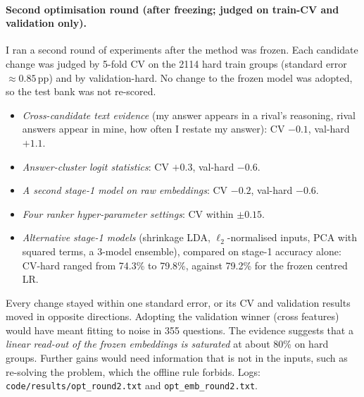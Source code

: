 \documentclass[10pt,a4paper]{article}
\begin{document}
\paragraph{Second optimisation round (after freezing; judged on train-CV and validation only).}
I ran a second round of experiments after the method was frozen. Each candidate change was judged by 5-fold CV on the 2114 hard train groups (standard error ${\approx}0.85$\,pp) and by validation-hard. No change to the frozen model was adopted, so the test bank was not re-scored.
\begin{itemize}
\item \emph{Cross-candidate text evidence} (my answer appears in a rival's reasoning, rival answers appear in mine, how often I restate my answer): CV $-0.1$, val-hard $+1.1$.
\item \emph{Answer-cluster logit statistics}: CV $+0.3$, val-hard $-0.6$.
\item \emph{A second stage-1 model on raw embeddings}: CV $-0.2$, val-hard $-0.6$.
\item \emph{Four ranker hyper-parameter settings}: CV within $\pm0.15$.
\item \emph{Alternative stage-1 models} (shrinkage LDA, $\ell_2$-normalised inputs, PCA with squared terms, a 3-model ensemble), compared on stage-1 accuracy alone: CV-hard ranged from 74.3\% to 79.8\%, against 79.2\% for the frozen centred LR.
\end{itemize}
Every change stayed within one standard error, or its CV and validation results moved in opposite directions. Adopting the validation winner (cross features) would have meant fitting to noise in 355 questions. The evidence suggests that a \emph{linear read-out of the frozen embeddings is saturated} at about 80\% on hard groups. Further gains would need information that is not in the inputs, such as re-solving the problem, which the offline rule forbids. Logs: \texttt{code/results/opt\_round2.txt} and \texttt{opt\_emb\_round2.txt}.
\end{document}
